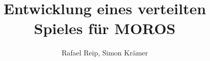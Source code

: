 \documentclass[sigconf]{acmart}
\begin{document}
    \title{Entwicklung eines verteilten Spieles für MOROS}

    \author{Rafael Reip, Simon Krämer}


    \renewcommand{\shortauthors}{Reip, Krämer}

    \begin{abstract}
        
    \end{abstract}

    \maketitle

    
    
    
    
    
    
    






\end{document}
